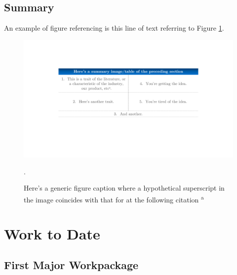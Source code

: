 \documentclass[pdftex,12pt,a4paper]{article}
\begin{document}
\subsection{Summary} \label{sec:literaturesummary}
An example of figure referencing is this line of text referring to Figure \ref{fig:theory_summary}.

\bigskip

\blindtext		%

\begin{figure}[h]	%
	\centering
	\includegraphics[scale=0.6]{Images/theory_summary}
	\captionsetup{justification=centering}	%
	\caption{Here's a generic figure caption where a hypothetical superscript in the image coincides with that for at the following citation \textsuperscript{a}\cite{Goodenough2013a}}.
	\label{fig:theory_summary}	%
\end{figure}

\newpage

\section{\textbf{Work to Date}} \label{sec:work to date}

\subsection{First Major Workpackage} \label{sec:First Major Body of Work}
\blindtext		%
\end{document}

